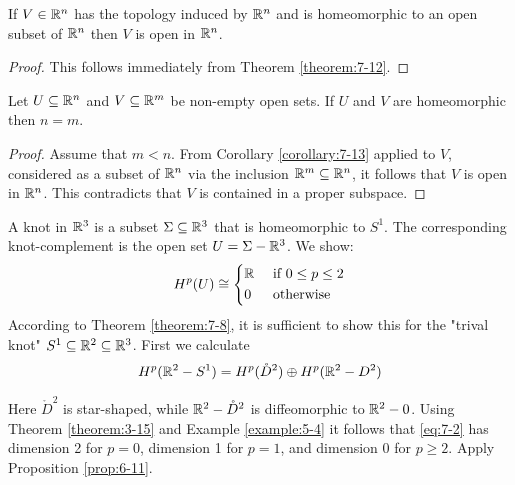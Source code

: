 \begin{corollary}\label{corollary:7-13}
  If $V\in\mathbb{R}^n$ has the topology induced by $\mathbb{R}^n$ and is homeomorphic to an open subset of $\mathbb{R}^n$ then 
  $V$ is open in $\mathbb{R}^n$.
\end{corollary}

\begin{proof}
  This follows immediately from Theorem \ref{theorem:7-12}.
\end{proof}

\begin{corollary}\label{corollary:7-14}
  Let $U\subseteq \mathbb{R}^n$ and $V\subseteq \mathbb{R}^m$ be non-empty open sets. If $U$ and $V$ are homeomorphic
  then $n=m$.
\end{corollary}

\begin{proof}
  Assume that $m < n$. From Corollary \ref{corollary:7-13} applied to $V$, considered as a
subset of $\mathbb{R}^n$ via the inclusion $\mathbb{R}^m\subseteq\mathbb{R}^n$, it follows that $V$ is open in $\mathbb{R}^n$.
This contradicts that $V$ is contained in a proper subspace.
\end{proof}

\begin{example}\label{example:7-15}
  A knot in $\mathbb{R}^3$ is a subset $\Sigma\subseteq\mathbb{R}^3$ that is homeomorphic to $S^1$. The
corresponding knot-complement is the open set $U=\Sigma - \mathbb{R}^3$. We show:
\begin{align*}
  H^p(U)\cong \left\{\begin{aligned}
    & \mathbb{R} && \text{ if } 0\le p\le 2 \\
    & 0 && \text{ otherwise }
  \end{aligned}\right.
\end{align*}
According to Theorem \ref{theorem:7-8}, it is sufficient to show this for the "trival knot"
$S^1\subseteq \mathbb{R}^2\subseteq\mathbb{R}^3$. First we calculate
\begin{align}\label{eq:7-2}
  H^p(\mathbb{R}^2-S^1) = H^p(\mathring{D}^2)\oplus H^p(\mathbb{R}^2-D^2)
\end{align}

Here $\mathring{D}^2$ is star-shaped, while $\mathbb{R}^2-\mathring{D}^2$ is diffeomorphic 
to $\mathbb{R}^2-{0}$. Using Theorem \ref{theorem:3-15} and Example \ref{example:5-4} it follows 
that \eqref{eq:7-2} has dimension 2 for $p = 0$, dimension 1 for $p = 1$, and dimension 0 
for $p\ge 2$. Apply Proposition \ref{prop:6-11}.
\end{example}

